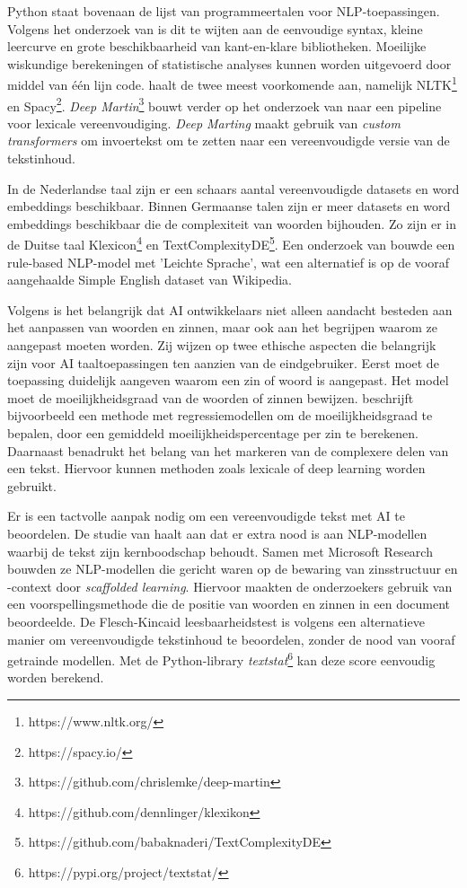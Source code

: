 Python staat bovenaan de lijst van programmeertalen voor NLP-toepassingen. Volgens het onderzoek van \textcite{Thangarajah2019} is dit te wijten aan de eenvoudige syntax, kleine leercurve en grote beschikbaarheid van kant-en-klare bibliotheken. Moeilijke wiskundige berekeningen of statistische analyses kunnen worden uitgevoerd door middel van één lijn code. \textcite{Malik2022} haalt de twee meest voorkomende aan, namelijk NLTK\footnote{https://www.nltk.org/} en Spacy\footnote{https://spacy.io/}. \textit{Deep Martin}\footnote{https://github.com/chrislemke/deep-martin} bouwt verder op het onderzoek van \textcite{Shardlow2014} naar een pipeline voor lexicale vereenvoudiging. \textit{Deep Marting} maakt gebruik van \textit{custom transformers} om invoertekst om te zetten naar een vereenvoudigde versie van de tekstinhoud.

In de Nederlandse taal zijn er een schaars aantal vereenvoudigde datasets en word embeddings beschikbaar. Binnen Germaanse talen zijn er meer datasets en word embeddings beschikbaar die de complexiteit van woorden bijhouden. Zo zijn er in de Duitse taal Klexicon\footnote{https://github.com/dennlinger/klexikon} en TextComplexityDE\footnote{https://github.com/babaknaderi/TextComplexityDE}. Een onderzoek van \textcite{Suter2016} bouwde een rule-based NLP-model met 'Leichte Sprache', wat een alternatief is op de vooraf aangehaalde Simple English dataset van Wikipedia.

Volgens \textcite{Garbacea2021} is het belangrijk dat AI ontwikkelaars niet alleen aandacht besteden aan het aanpassen van woorden en zinnen, maar ook aan het begrijpen waarom ze aangepast moeten worden. Zij wijzen op twee ethische aspecten die belangrijk zijn voor AI taaltoepassingen ten aanzien van de eindgebruiker. Eerst moet de toepassing duidelijk aangeven waarom een zin of woord is aangepast. Het model moet de moeilijkheidsgraad van de woorden of zinnen bewijzen. \textcite{Iavarone2021} beschrijft bijvoorbeeld een methode met regressiemodellen om de moeilijkheidsgraad te bepalen, door een gemiddeld moeilijkheidspercentage per zin te berekenen. Daarnaast benadrukt \textcite{Garbacea2021} het belang van het markeren van de complexere delen van een tekst. Hiervoor kunnen methoden zoals lexicale of deep learning worden gebruikt.

Er is een tactvolle aanpak nodig om een vereenvoudigde tekst met AI te beoordelen. De studie van \textcite{Swayamdipta2019} haalt aan dat er extra nood is aan NLP-modellen waarbij de tekst zijn kernboodschap behoudt. Samen met Microsoft Research bouwden ze NLP-modellen die gericht waren op de bewaring van zinsstructuur en -context door \emph{scaffolded learning}. Hiervoor maakten de onderzoekers gebruik van een voorspellingsmethode die de positie van woorden en zinnen in een document beoordeelde. De Flesch-Kincaid leesbaarheidstest is volgens \textcite{Readable2021} een alternatieve manier om vereenvoudigde tekstinhoud te beoordelen, zonder de nood van vooraf getrainde modellen. Met de Python-library \textit{textstat}\footnote{https://pypi.org/project/textstat/} kan deze score eenvoudig worden berekend. 

